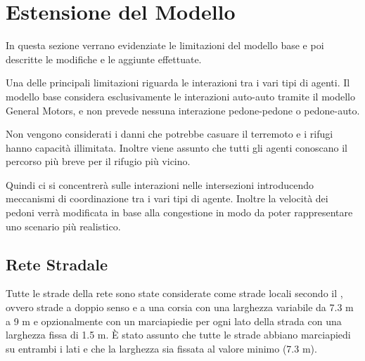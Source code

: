 \newpage

\section{Estensione del Modello}
\label{sec:estensione}
In questa sezione verrano evidenziate le limitazioni del modello base e poi descritte le modifiche e le aggiunte effettuate.

Una delle principali limitazioni riguarda le interazioni tra i vari tipi di agenti.
Il modello base considera esclusivamente le interazioni auto-auto
tramite il modello General Motors, e non prevede nessuna interazione pedone-pedone o pedone-auto.

Non vengono considerati i danni che potrebbe casuare il terremoto e i rifugi hanno capacità illimitata.
%
Inoltre viene assunto che tutti gli agenti conoscano il percorso più breve per il rifugio più vicino.

Quindi ci si concentrerà sulle interazioni nelle intersezioni introducendo meccanismi di coordinazione tra i vari tipi di agente.
Inoltre la velocità dei pedoni verrà modificata in base alla congestione in modo da poter rappresentare uno scenario più realistico.

\subsection{Rete Stradale}
Tutte le strade della rete sono state considerate come strade locali secondo il \textcite{seaside2010tsp},
ovvero strade a doppio senso e a una corsia con una larghezza variabile da 7.3 m a 9 m e opzionalmente con
un marciapiedie per ogni lato della strada con una larghezza fissa di 1.5 m.
%
È stato assunto che tutte le strade abbiano marciapiedi su entrambi i lati e che la larghezza sia fissata al valore minimo (7.3 m).

